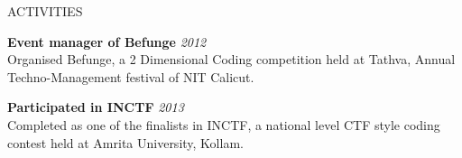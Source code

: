 \documentclass{resume} %
\begin{document}
\begin{rSection}{ACTIVITIES}

{\bf Event manager of Befunge} \hfill {\em 2012} \\  
Organised Befunge, a 2 Dimensional Coding competition held at Tathva, Annual Techno-Management festival of NIT Calicut. 

{\bf Participated in INCTF} \hfill {\em 2013} \\ 
Completed as one of the finalists in INCTF, a national level CTF style coding contest held at Amrita University, Kollam.


\end{rSection}




\end{document}
